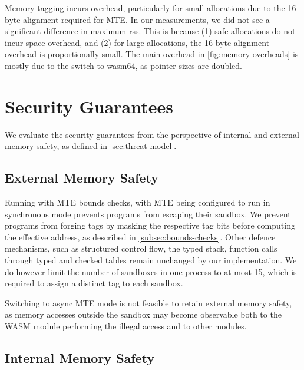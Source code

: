 Memory tagging incurs overhead, particularly for small allocations due to the 16-byte alignment required for \ac{MTE}.
In our measurements, we did not see a significant difference in maximum \ac{rss}.
This is because (1) safe allocations do not incur space overhead, and (2) for large allocations, the 16-byte alignment overhead is proportionally small.
The main overhead in \cref{fig:memory-overheads} is mostly due to the switch to wasm64, as pointer sizes are doubled.

\begin{figure*}[t]
    \centering
    
    \caption{PolyBench/C memory overheads of different configurations described in \cref{tab:benchmark-variants}, normalized to wasm64.}
    \label{fig:memory-overheads}
\end{figure*}

\section{Security Guarantees}\label{sec:security-guarantees}

We evaluate the security guarantees from the perspective of internal and external memory safety, as defined in \cref{sec:threat-model}.

\subsection{External Memory Safety}
\label{subsec:sec-guarantees-external-memory-safety}

Running with \ac{MTE} bounds checks, with \ac{MTE} being configured to run in synchronous mode prevents programs from escaping their sandbox.
We prevent programs from forging tags by masking the respective tag bits before computing the effective address, as described in \cref{subsec:bounds-checks}.
Other defence mechanisms, such as structured control flow, the typed stack, function calls through typed and checked tables remain unchanged by our implementation.
We do however limit the number of sandboxes in one process to at most 15, which is required to assign a distinct tag to each sandbox.

Switching to async \ac{MTE} mode is not feasible to retain external memory safety, as memory accesses outside the sandbox may become observable both to the \ac{WASM} module performing the illegal access and to other modules.

\subsection{Internal Memory Safety}
\label{subsec:sec-guarantees-internal-memory-safety}

